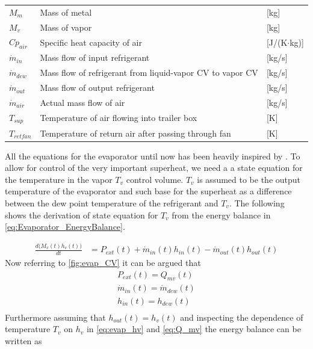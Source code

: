 \begin{center}
\begin{tabular}{l p{10cm} l}
		$M_{m}$          & Mass of metal                                                            & [\si{kg}]                         \\
		$M_{v}$          & Mass of vapor                                                            & [\si{kg}]                         \\
		$Cp_{air}$       & Specific heat capacity of air                                            & [\si{J}/(\si{K}$ \cdot $\si{kg})] \\
		$\dot{m}_{in} $  & Mass flow of input refrigerant                                           & [\si{kg}/\si{s}]                  \\
		$\dot{m}_{dew} $ & Mass flow of refrigerant from liquid-vapor CV to vapor CV                & [\si{kg}/\si{s}]                  \\
		$\dot{m}_{out} $ & Mass flow of output refrigerant                                          & [\si{kg}/\si{s}]                  \\
		$\dot{m}_{air}$  & Actual mass flow of air                                                  & [\si{kg}/\si{s}]                  \\
		$T_{sup} $       & Temperature of air flowing into trailer box                              & [\si{K}]                          \\
		$T_{retfan}$     & Temperature of return air after passing through fan                      & [\si{K}]
	\end{tabular}
\end{center}

All the equations for the evaporator until now has been heavily inspired by \cite{Sorensen2013}. To allow for control of the very important superheat, we need a a state equation for the temperature in the vapor $ T_v $ control volume. $ T_v $ is assumed to be the output temperature of the evaporator and such base for the superheat as a difference between the dew point temperature of the refrigerant and $ T_v $. The following shows the derivation of state equation for $ T_v $ from the energy balance in \cref{eq:Evaporator_EnergyBalance}.

\begin{align}
	\frac{ d\bigl(M_{v}(t) h_v(t) \bigr)}{dt} & = P_{ext}(t) + \dot{m}_{in}(t)h_{in}(t) - \dot{m}_{out}(t)h_{out}(t) 		\label{eq:Evaporator_EnergyBalance}
\end{align}
Now referring to \cref{fig:evap_CV} it can be argued that 
\begin{align}
	P_{ext}(t) = Q_{mv}(t) \\
	\dot{m}_{in}(t) = \dot{m}_{dew}(t)\\
	h_{in}(t) = h_{dew}(t) \\
\end{align}
Furthermore assuming that $ h_{out}(t) = h_v(t) $ and inspecting the dependence of temperature $T_v$ on $ h_v $ in \cref{eq:evap_hv} and \cref{eq:Q_mv}
the energy balance can be written as 

